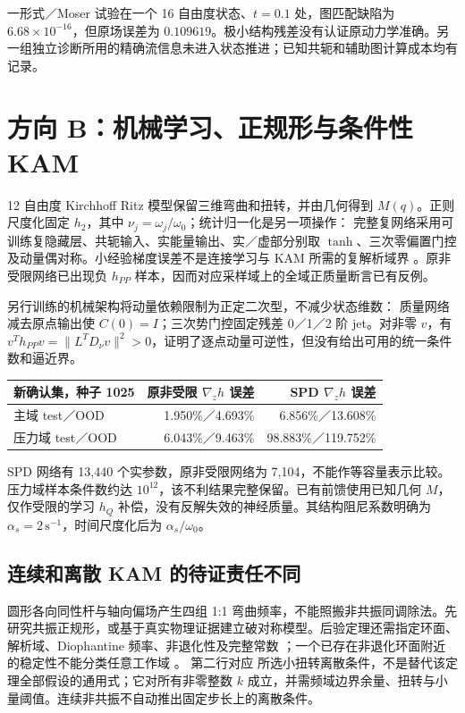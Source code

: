 一形式／Moser 试验在一个 16 自由度状态、$t=0.1$ 处，图匹配缺陷为 $6.68\times10^{-16}$，但原场误差为 $0.109619$。极小结构残差没有认证原动力学准确。另一组独立诊断所用的精确流信息未进入状态推进；已知共轭和辅助图计算成本均有记录。

\PaperPage
\section{方向 B：机械学习、正规形与条件性 KAM}
12 自由度 Kirchhoff Ritz 模型保留三维弯曲和扭转，并由几何得到 $M(q)$。正则尺度化固定 $h_2$，其中 $\nu_j=\omega_j/\omega_0$；统计归一化是另一项操作：
\EqLearningNormalization
完整复网络采用可训练复隐藏层、共轭输入、实能量输出、实／虚部分别取 $\tanh$、三次零偏置门控及动量偶对称。小经验梯度误差不是连接学习与 KAM 所需的复解析域界 \citep{chen2022}。原非受限网络已出现负 $h_{PP}$ 样本，因而对应采样域上的全域正质量断言已有反例。

另行训练的机械架构将动量依赖限制为正定二次型，不减少状态维数：
\EqMechanicalNetwork
质量网络减去原点输出使 $C(0)=I$；三次势门控固定残差 0／1／2 阶 jet。对非零 $v$，有 $v^Th_{PP}v=\|L^TD_\nu v\|^2>0$，证明了逐点动量可逆性，但没有给出可用的统一条件数和逼近界。

\begin{tabularx}{\textwidth}{@{}Xrr@{}}
\toprule
新确认集，种子 1025 & 原非受限 $\nabla_z h$ 误差 & SPD $\nabla_z h$ 误差\\
\midrule
主域 test／OOD & 1.950\%／4.693\% & 6.856\%／13.608\%\\
压力域 test／OOD & 6.043\%／9.463\% & 98.883\%／119.752\%\\
\bottomrule
\end{tabularx}
SPD 网络有 13,440 个实参数，原非受限网络为 7,104，不能作等容量表示比较。压力域样本条件数约达 $10^{12}$，该不利结果完整保留。已有前馈使用已知几何 $M$，仅作受限的学习 $h_Q$ 补偿，没有反解失效的神经质量。其结构阻尼系数明确为 $\alpha_s=2\,\mathrm{s}^{-1}$，时间尺度化后为 $\alpha_s/\omega_0$。

\subsection{连续和离散 KAM 的待证责任不同}
圆形各向同性杆与轴向偏场产生四组 1:1 弯曲频率，不能照搬非共振同调除法。先研究共振正规形，或基于真实物理证据建立破对称模型。后验定理还需指定环面、解析域、Diophantine 频率、非退化性及完整常数 \citep{haroluque2019}；一个已存在非退化环面附近的稳定性不能分类任意工作域 \citep{bounemoura2016}。
\EqKAMDivisors
第二行对应 \citet{shang1999} 所选小扭转离散条件，不是替代该定理全部假设的通用式；它对所有非零整数 $k$ 成立，并需频域边界余量、扭转与小量阈值。连续非共振不自动推出固定步长上的离散条件。

